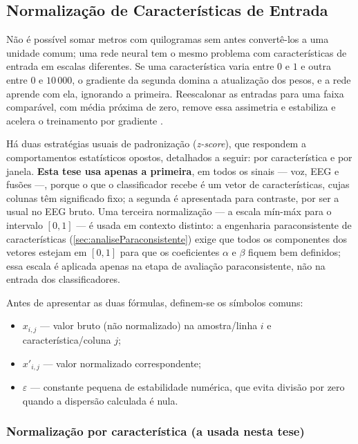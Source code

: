 		\subsection{Normalização de Características de Entrada}
			\label{sec:normalizacaoEntrada}

			\par Não é possível somar metros com quilogramas sem antes convertê-los a uma unidade comum; uma rede neural tem o mesmo problema com características de entrada em escalas diferentes. Se uma característica varia entre $0$ e $1$ e outra entre $0$ e $10\,000$, o gradiente da segunda domina a atualização dos pesos, e a rede aprende com ela, ignorando a primeira. Reescalonar as entradas para uma faixa comparável, com média próxima de zero, remove essa assimetria e estabiliza e acelera o treinamento por gradiente \cite{lecun1998efficient}.

			\par Há duas estratégias usuais de padronização (\textit{z-score}), que respondem a comportamentos estatísticos opostos, detalhados a seguir: por característica e por janela. \textbf{Esta tese usa apenas a primeira}, em todos os sinais --- voz, \ac{EEG} e fusões ---, porque o que o classificador recebe é um vetor de características, cujas colunas têm significado fixo; a segunda é apresentada para contraste, por ser a usual no \ac{EEG} bruto. Uma terceira normalização --- a escala mín-máx para o intervalo $[0,1]$ --- é usada em contexto distinto: a engenharia paraconsistente de características (\autoref{sec:analiseParaconsistente}) exige que todos os componentes dos vetores estejam em $[0,1]$ para que os coeficientes $\alpha$ e $\beta$ fiquem bem definidos; essa escala é aplicada apenas na etapa de avaliação paraconsistente, não na entrada dos classificadores.

			\par Antes de apresentar as duas fórmulas, definem-se os símbolos comuns:
			\begin{itemize}
				\item $x_{i,j}$ --- valor bruto (não normalizado) na amostra/linha $i$ e característica/coluna $j$;
				\item $x'_{i,j}$ --- valor normalizado correspondente;
				\item $\varepsilon$ --- constante pequena de estabilidade numérica, que evita divisão por zero quando a dispersão calculada é nula.
			\end{itemize}

			\subsubsection{Normalização por característica (a usada nesta tese)}

